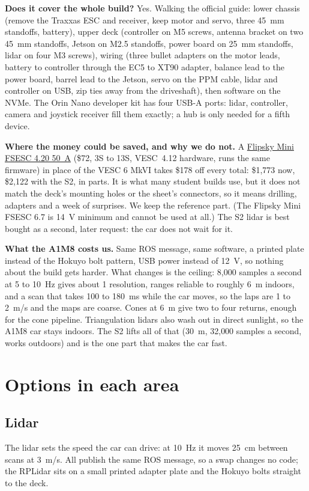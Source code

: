 \documentclass[11pt,a4paper]{article}
\begin{document}
\smallskip
\textbf{Does it cover the whole build?} Yes. Walking the official guide: lower chassis (remove
the Traxxas ESC and receiver, keep motor and servo, three 45~mm standoffs, battery), upper deck
(controller on M5 screws, antenna bracket on two 45~mm standoffs, Jetson on M2.5 standoffs,
power board on 25~mm standoffs, lidar on four M3 screws), wiring (three bullet adapters on the
motor leads, battery to controller through the EC5 to XT90 adapter, balance lead to the power
board, barrel lead to the Jetson, servo on the PPM cable, lidar and controller on USB, zip ties
away from the driveshaft), then software on the NVMe. The Orin Nano developer kit has four
USB-A ports: lidar, controller, camera and joystick receiver fill them exactly; a hub is only
needed for a fifth device.

\textbf{Where the money could be saved, and why we do not.} A
\href{https://www.amazon.com/dp/B08725X8CT}{Flipsky Mini FSESC 4.20 50~A} (\$72, 3S to 13S,
VESC~4.12 hardware, runs the same firmware) in place of the VESC 6 MkVI takes \$178 off every
total: \$1{,}773 now, \$2{,}122 with the S2, in parts. It is what many student builds use, but it does not match
the deck's mounting holes or the sheet's connectors, so it means drilling, adapters and a
week of surprises. We keep the reference part. (The Flipsky Mini FSESC 6.7 is 14~V minimum
and cannot be used at all.) The S2 lidar is best bought as a second, later request: the car
does not wait for it.

\textbf{What the A1M8 costs us.} Same ROS message, same software, a printed plate instead of
the Hokuyo bolt pattern, USB power instead of 12~V, so nothing about the build gets harder.
What changes is the ceiling: 8{,}000 samples a second at 5 to 10~Hz gives about 1\textdegree{}
resolution, ranges reliable to roughly 6~m indoors, and a scan that takes 100 to 180~ms while
the car moves, so the laps are 1 to 2~m/s and the maps are coarse. Cones at 6~m give two to four
returns, enough for the cone pipeline. Triangulation lidars also wash out in direct sunlight,
so the A1M8 car stays indoors. The S2 lifts all of that (30~m, 32{,}000 samples a second, works
outdoors) and is the one part that makes the car fast.

\section{Options in each area}

\subsection*{Lidar}
The lidar sets the speed the car can drive: at 10~Hz it moves 25~cm between scans at 3~m/s.
All publish the same ROS message, so a swap changes no code; the RPLidar sits on a small
printed adapter plate and the Hokuyo bolts straight to the deck.
\end{document}
